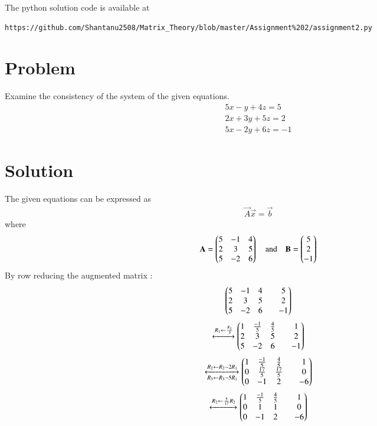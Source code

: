 \documentclass[journal,12pt,twocolumn]{IEEEtran}
\begin{document}
The python solution code is available at
\begin{lstlisting}
https://github.com/Shantanu2508/Matrix_Theory/blob/master/Assignment%202/assignment2.py
\end{lstlisting}
%
\section{Problem}
Examine the consistency of the system of the given equations.
\begin{align}
	5x -  y + 4z = 5 \nonumber \\
	2x + 3y + 5z = 2 \\
	5x - 2y + 6z =-1 \nonumber
\end{align}
\section{Solution}
	The given equations can be expressed as
\begin{align}
	\vec{A} \vec{x} = \vec{b}  
\end{align}
where
\begin{align}
	\mathbf{A} = \begin{pmatrix} 5 & -1 & 4 \\ 2 &  3 & 5 \\ 5 & -2 & 6 \end{pmatrix}
	\quad \text{and} \quad
	\mathbf{B} = \begin{pmatrix} 5 \\  2 \\ -1\end{pmatrix}
\end{align}
By row reducing the augmented matrix :
\begin{align}
	\begin{pmatrix} 5 & -1 & 4 & & 5 \\ 2 & 3 & 5 & & 2 \\ 5 & -2 & 6 & & -1\end{pmatrix}
\end{align}
\begin{align}
    \xleftrightarrow[]{R_1 \leftarrow \frac{R_1}{5}}
	\begin{pmatrix}1 & \frac{-1}{5} & \frac{4}{5} & & 1 \\ 
	       2 & 3 & 5 & & 2 \\ 5 & -2 & 6 & & -1\end{pmatrix}
\end{align}
\begin{align}
	\xleftrightarrow[ R_3 \leftarrow R_3-5R_1]{R_2 \leftarrow R_2-2R_1}
	\begin{pmatrix}1 & \frac{-1}{5} & \frac{4}{5} & & 1 \\ 
	       0 & \frac{17}{5} & \frac{17}{5} & & 0 \\ 0 & -1 & 2 & & -6\end{pmatrix}
\end{align}
\begin{align}
	\xleftrightarrow[]{R_2 \leftarrow \frac{5}{17}R_2}
	\begin{pmatrix}1 & \frac{-1}{5} & \frac{4}{5} & & 1 \\ 
	       0 & 1 & 1 & & 0 \\ 0 & -1 & 2 & & -6\end{pmatrix}
\end{align}
\end{document}
